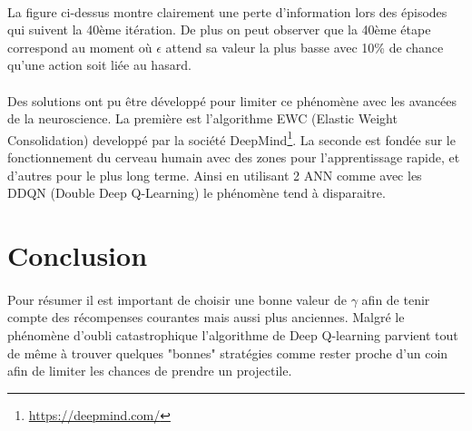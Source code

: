 \documentclass[12pt,oneside,a4paper]{article}
\begin{document}
    \paragraph{}
    La figure ci-dessus montre clairement une perte d'information lors des épisodes qui suivent la 40ème itération.
    De plus on peut observer que la 40ème étape correspond au moment où $\epsilon$ attend sa valeur la plus basse
    avec 10\% de chance qu'une action soit liée au hasard.

    \paragraph{}
    Des solutions ont pu être développé pour limiter ce phénomène avec les avancées de la neuroscience. La première
    est l'algorithme EWC (Elastic Weight Consolidation) developpé par la société DeepMind\footnote{\url{https://deepmind.com/}}.
    La seconde est fondée sur le fonctionnement du cerveau humain avec des zones pour l'apprentissage rapide, et
    d'autres pour le plus long terme. Ainsi en utilisant 2 ANN comme avec les DDQN (Double Deep Q-Learning)
    le phénomène tend à disparaitre.


    \section{Conclusion}

    \paragraph{}
    Pour résumer il est important de choisir une bonne valeur de $\gamma$ afin de tenir compte des récompenses courantes
    mais aussi plus anciennes. Malgré le phénomène d'oubli catastrophique l'algorithme de Deep Q-learning parvient tout de même
    à trouver quelques "bonnes" stratégies comme rester proche d'un coin afin de limiter les chances de prendre un projectile.
\end{document}
